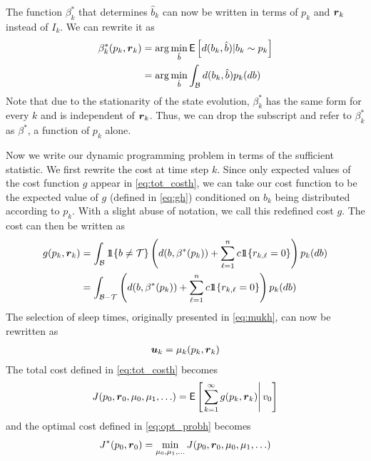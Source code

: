 \documentclass[journal,draftcls,onecolumn,11pt]{IEEEtran}
\newcommand{\emb}[1]{\text{\boldmath{$#1$}}}
\newcommand{\Expect}{\textsf{E}}
\newcommand{\indic}[1]{\mbox{$1\!\!1$}{\{#1\}}}
\newcommand{\term}{\mathcal{T}}
\begin{document}
The function $\beta_k^*$ that determines $\hat{b}_k$ can now be written in terms of $p_k$ and $\emb{r}_k$ instead of $I_k$.  We can rewrite it as
\begin{align}
   \beta_k^*(p_k,\emb{r}_k)  & = \arg \min_{\hat{b}} \Expect\left[
      d(b_k,\hat{b}) | b_k \sim p_k
   \right] \\
   & = \arg \min_{\hat{b}} \int_{\mathcal{B}} d(b_k,\hat{b}) p_k(db)
\end{align}
Note that due to the stationarity of the state evolution, $\beta_k^*$ has the same form for every $k$ and is independent of $\emb{r}_k$.  Thus, we can drop the subscript and refer to $\beta_k^*$ as $\beta^*$, a function of $p_k$ alone.

Now we write our dynamic programming problem in terms of the sufficient statistic.  We first rewrite the cost at time step $k$.  Since only expected values of the cost function $g$ appear in \eqref{eq:tot_costh}, we can take our cost function to be the expected value of $g$ (defined in \eqref{eq:gh}) conditioned on $b_k$ being distributed according to $p_k$. With a slight abuse of notation, we call this redefined cost $g$. The cost can then be written as
\begin{align}
   g(p_k,\emb{r}_k) & = \int_{\mathcal{B}} \indic{b  \neq \term} \left(
      d(b, \beta^*(p_k))
      + \sum_{\ell=1}^n c \indic{r_{k,\ell} = 0}
   \right) p_k(db) \\
   & = \int_{\mathcal{B} - \term} \left(
      d(b, \beta^*(p_k))
      + \sum_{\ell=1}^n c \indic{r_{k,\ell} = 0}
   \right) p_k(db)
\end{align}
The selection of sleep times, originally presented in \eqref{eq:mukh}, can now be rewritten as
\begin{align}
   \emb{u}_k = \mu_k(p_k,\emb{r}_k)
\end{align}
The total cost defined in \eqref{eq:tot_costh} becomes
\begin{align}
   J(p_0,\emb{r}_0, \mu_0, \mu_1, \ldots) = \Expect \left[ \left. \sum_{k=1}^{\infty} g(p_k,\emb{r}_k) \right| v_0 \right]
\end{align}
and the optimal cost defined in \eqref{eq:opt_probh} becomes
\begin{align}
   J^*(p_0,\emb{r}_0)=\min_{\mu_0,\mu_1, \hdots} J(p_0,\emb{r}_0,\mu_0, \mu_1, \hdots)
\end{align}
\end{document}
